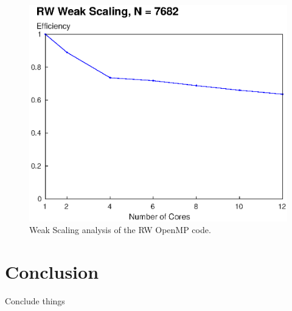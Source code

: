 \documentclass[letterpaper]{article}
\begin{document}
\begin{figure}\centering
  \includegraphics[width=\linewidth]{./plots/scaling_weak_RW.eps}
  \caption{Weak Scaling analysis of the RW OpenMP code.}
  \label{fig:scaling_weak_RW}
\end{figure}


\section{Conclusion}
Conclude things

\end{document}
